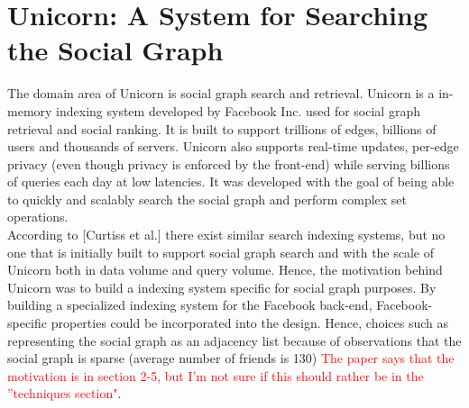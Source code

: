 \documentclass{article}
\begin{document}
\section*{Unicorn: A System for Searching the Social Graph}

The domain area of Unicorn is social graph search and retrieval. Unicorn is a in-memory indexing system developed by Facebook Inc. used for social graph retrieval and social ranking. It is built to support trillions of edges, billions of users and thousands of servers. Unicorn also supports real-time updates, per-edge privacy (even though privacy is enforced by the front-end) while serving billions of queries each day at low latencies. It was developed with the goal of being able to quickly and scalably search the social graph and perform complex set operations. \\

\noindent According to [Curtiss et al.] there exist similar search indexing systems, but no one that is initially built to support social graph search and with the scale of Unicorn both in data volume and query volume. Hence, the motivation behind Unicorn was to build a indexing system specific for social graph purposes. By building a specialized indexing system for the Facebook back-end, Facebook-specific properties could be incorporated into the design. Hence, choices such as representing the social graph as an adjacency list because of observations that the social graph is sparse (average number of friends is 130) \textcolor{red}{The paper says that the motivation is in section 2-5, but I'm not sure if this should rather be in the ''techniques section"}.\\
\end{document}
